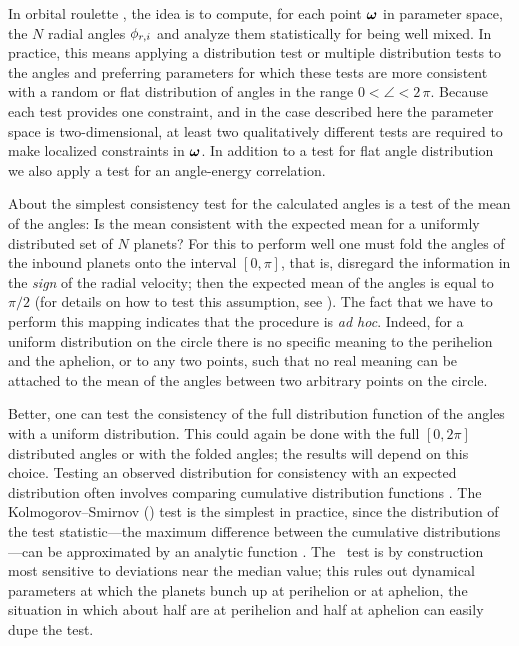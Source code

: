 In orbital roulette \citep{roulette}, the idea is to compute, for each
point $\boldsymbol{{\omega}}$ in parameter space, the $N$ radial angles $\phi_{r,i}$
and analyze them statistically for being well mixed.  In practice,
this means applying a distribution test or multiple distribution tests
to the angles and preferring parameters for which these tests are more
consistent with a random or flat distribution of angles in the range
$0<\angle<2\,\pi$.  Because each test provides one constraint, and in
the case described here the parameter space is two-dimensional, at
least two qualitatively different tests are required to make localized
constraints in $\boldsymbol{{\omega}}$.  In addition to a test for flat angle
distribution we also apply a test for an angle-energy correlation.

About the simplest consistency test for the calculated angles is a
test of the mean of the angles: Is the mean consistent with the
expected mean for a uniformly distributed set of $N$ planets? For this
to perform well one must fold the angles of the inbound planets onto
the interval $[0,\pi]$, that is, disregard the information in the
\emph{sign} of the radial velocity; then the expected mean of the
angles is equal to $\pi/2$ (for details on how to test this
assumption, see \citealt{roulette}). The fact that we have to perform
this mapping indicates that the procedure is \textit{ad
  hoc}. Indeed, for a uniform distribution on the circle there is no
specific meaning to the perihelion and the aphelion, or to any two
points, such that no real meaning can be attached to the mean of the
angles between two arbitrary points on the circle.

Better, one can test the consistency of the full distribution function
of the angles with a uniform distribution. This could again be done
with the full $[0,2\pi]$ distributed angles or with the folded angles;
the results will depend on this choice. Testing an observed
distribution for consistency with an expected distribution often
involves comparing cumulative distribution functions
\citep{Kolmogorov41a}.  The Kolmogorov--Smirnov (\KS) test is the
simplest in practice, since the distribution of the test
statistic---the maximum difference between the cumulative
distributions---can be approximated by an analytic function
\citep{Stephens70a}. The \KS\ test is by construction most sensitive
to deviations near the median value; this rules out dynamical
parameters at which the planets bunch up at perihelion or at aphelion,
the situation in which about half are at perihelion and half at
aphelion can easily dupe the test.

